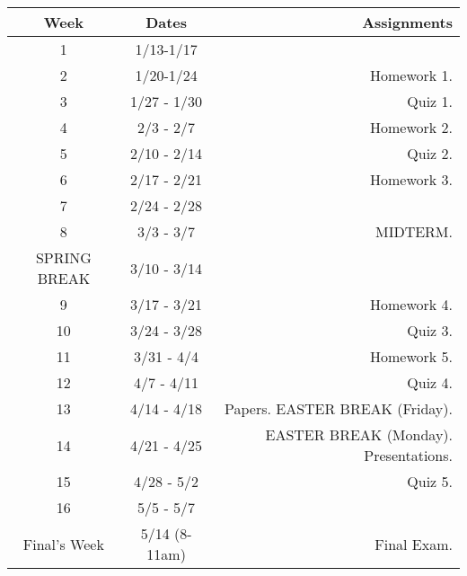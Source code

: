 \documentclass[10pt]{article}
\begin{document}
\begin{center}
\begin{tabular}{|c|c|r|}
\hline 
Week & Dates & Assignments \\
\hline
1 & 1/13-1/17 &  \\
\hline
2 & 1/20-1/24 & Homework 1.\\
\hline
3 & 1/27 - 1/30 &  Quiz 1.\\
\hline
4 & 2/3 - 2/7 &  Homework 2. \\
\hline
5 & 2/10 - 2/14 &  Quiz 2.\\
\hline
6 & 2/17 - 2/21 &  Homework 3.\\
\hline
7 & 2/24 - 2/28 &  \\
\hline
8 & 3/3 - 3/7 &  MIDTERM.\\
\hline 
SPRING BREAK & 3/10 - 3/14& \\
\hline
9 & 3/17 - 3/21 & Homework 4.\\
\hline
10 & 3/24 - 3/28 & Quiz 3.\\
\hline
11 & 3/31 - 4/4 &  Homework 5.\\
\hline
12 & 4/7 - 4/11 &   Quiz 4.\\
\hline
13 & 4/14 - 4/18 &  Papers. EASTER BREAK (Friday).\\
\hline
14 & 4/21 - 4/25 & EASTER BREAK (Monday).  Presentations. \\
\hline
15 & 4/28 - 5/2 &  Quiz 5.\\ 
\hline
16 & 5/5 - 5/7 & \\
\hline
Final's Week & 5/14 (8-11am) & Final Exam. \\ 
\hline
\end{tabular}
\end{center}
\end{document}
